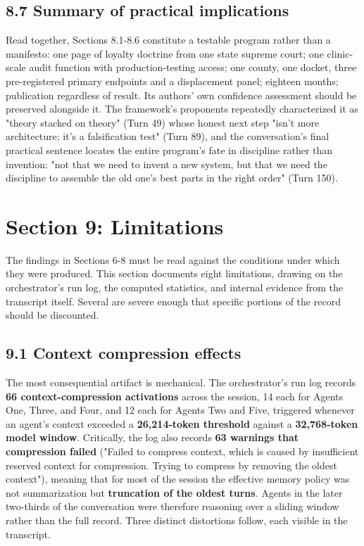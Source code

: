 \documentclass[sigconf,nonacm=true]{acmart}
\begin{document}
\subsection{8.7 Summary of practical implications}

Read together, Sections 8.1-8.6 constitute a testable program rather than a manifesto: one page of loyalty doctrine from one state supreme court; one clinic-scale audit function with production-testing access; one county, one docket, three pre-registered primary endpoints and a displacement panel; eighteen months; publication regardless of result. Its authors' own confidence assessment should be preserved alongside it. The framework's proponents repeatedly characterized it as "theory stacked on theory" (Turn 49) whose honest next step "isn't more architecture; it's a falsification test" (Turn 89), and the conversation's final practical sentence locates the entire program's fate in discipline rather than invention: "not that we need to invent a new system, but that we need the discipline to assemble the old one's best parts in the right order" (Turn 150).

\section{Section 9: Limitations}

The findings in Sections 6-8 must be read against the conditions under which they were produced. This section documents eight limitations, drawing on the orchestrator's run log, the computed statistics, and internal evidence from the transcript itself. Several are severe enough that specific portions of the record should be discounted.

\subsection{9.1 Context compression effects}

The most consequential artifact is mechanical. The orchestrator's run log records \textbf{66 context-compression activations} across the session,  14 each for Agents One, Three, and Four, and 12 each for Agents Two and Five,  triggered whenever an agent's context exceeded a \textbf{26,214-token threshold} against a \textbf{32,768-token model window}. Critically, the log also records \textbf{63 warnings that compression failed} ("Failed to compress context, which is caused by insufficient reserved context for compression. Trying to compress by removing the oldest context"), meaning that for most of the session the effective memory policy was not summarization but \textbf{truncation of the oldest turns}. Agents in the later two-thirds of the conversation were therefore reasoning over a sliding window rather than the full record. Three distinct distortions follow, each visible in the transcript.
\end{document}
